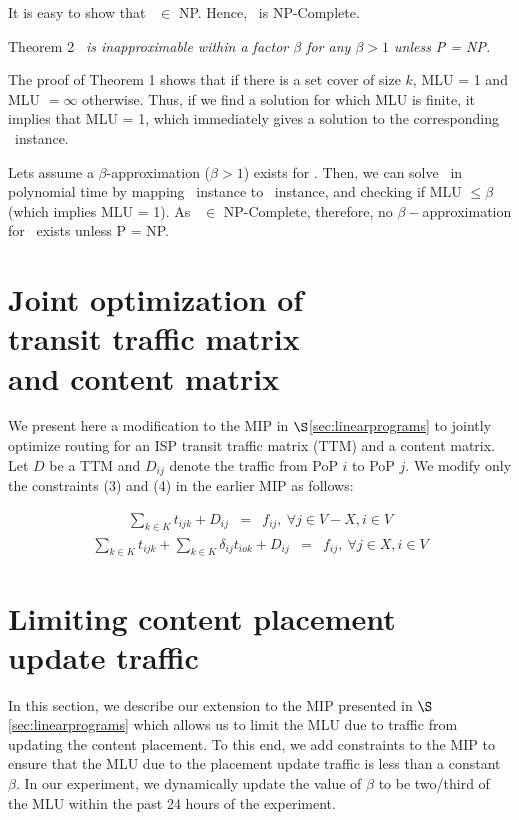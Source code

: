 It is easy to show that \optloc\ $\in$ NP. Hence, \optloc\ is NP-Complete.

\vspace{0.2in}

{{\sc Theorem 2}} {\em  \optloc\ is inapproximable within a factor $\beta$  for any $\beta > 1$ unless P = NP.}

\vspace{0.1in}

The proof of {\sc Theorem 1} shows that if there is a set cover of size $k$, MLU = 1 and MLU $= \infty$ otherwise. Thus, if we find a solution for which MLU is finite, it implies that MLU = 1, which immediately gives a solution to the corresponding \setcover\ instance.

Lets assume a  $\beta$-approximation ($\beta > 1$) exists for \optloc. Then, we can solve \setcover\ in polynomial time by mapping \setcover\ instance to \optloc\  instance, and checking if MLU $\leq \beta$ (which implies MLU = 1).  As \setcover\ $\in$ NP-Complete, therefore, no $\beta-$approximation for \optloc\ exists unless P = NP.

\section{Joint optimization of \\
transit traffic matrix \\
and content matrix}
\label{sec:ttmcm}

We present here a modification to the MIP in $\S$\ref{sec:linearprograms} to jointly optimize routing for an ISP transit traffic matrix (TTM) and a content matrix. Let $D$ be a TTM  and  $D_{ij}$ denote the traffic from PoP $i$ to PoP $j$. We modify only the constraints (3) and (4) in the earlier MIP as follows:

\begin{eqnarray}
\sum_{k \in K} t_{ijk}  + D_{ij}  &=& f_{ij} ,  \ \forall j \in V-X, i \in V
\end{eqnarray}
\begin{eqnarray}
\sum_{k \in K} t_{ijk} + \sum_{k \in K} \delta_{ij}  t_{iok}   + D_{ij} &=& f_{ij} ,  \ \forall j \in X, i \in V
\end{eqnarray}



\section{Limiting content placement\\ update traffic}
\label{sec:placementupdate}
In this section, we describe our extension to the MIP presented in $\S$\ref{sec:linearprograms} which allows us to limit the MLU due to traffic from updating the content placement. To this end, we add constraints to the MIP to ensure that the MLU due to the placement update traffic is less than a constant $\beta$. In our experiment, we dynamically update the value of $\beta$ to be two/third of the MLU within the past 24 hours of the experiment. 

